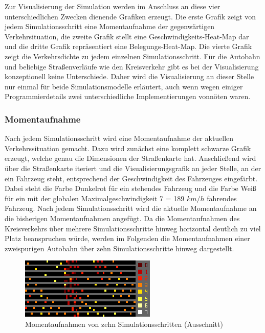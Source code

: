 \documentclass[11pt, a4paper]{article}
\begin{document}
Zur Visualisierung der Simulation werden im Anschluss an diese vier unterschiedlichen Zwecken dienende Grafiken
erzeugt. Die erste Grafik zeigt von jedem Simulationsschritt eine Momentaufnahme der gegenwärtigen Verkehrsituation, die zweite Grafik stellt eine Geschwindigkeits-Heat-Map dar und die dritte Grafik repräsentiert eine Belegungs-Heat-Map. Die vierte Grafik zeigt die Verkehrsdichte zu jedem einzelnen Simulationsschritt. Für die Autobahn und beliebige Straßenverläufe wie den Kreisverkehr gibt es bei der Visualisierung konzeptionell keine Unterschiede. Daher wird die Visualisierung an dieser Stelle nur einmal für beide Simulationsmodelle erläutert, auch wenn wegen einiger Programmierdetails zwei unterschiedliche Implementierungen vonnöten waren.

\subsubsection{Momentaufnahme}
\label{subsubsec:momentaufnahme}

Nach jedem Simulationsschritt wird eine Momentaufnahme der aktuellen Verkehrssituation gemacht. Dazu wird zunächst eine komplett schwarze Grafik erzeugt, welche genau die Dimensionen der Straßenkarte hat. Anschließend wird über die Straßenkarte iteriert und die Visualisierungsgrafik an jeder Stelle, an der ein Fahrzeug steht, entsprechend der Geschwindigkeit des Fahrzeuges eingefärbt. Dabei steht die Farbe Dunkelrot für ein stehendes Fahrzeug und die Farbe Weiß für ein mit der globalen Maximalgeschwindigkeit 7 = 189 $km/h$ fahrendes Fahrzeug. Nach jedem Simulationsschritt wird die aktuelle Momentaufnahme an die bisherigen Momentaufnahmen angefügt. Da die Momentaufnahmen des Kreisverkehrs über mehrere Simulationsschritte hinweg horizontal deutlich zu viel Platz beanspruchen würde, werden im Folgenden die Momentaufnahmen einer zweispurigen Autobahn über zehn Simulationsschritte hinweg dargestellt.

\begin{figure}[h!]
	\centering
	\includegraphics[height=2.91cm]{img/vis_multilane_2_lanes}
	\caption{Momentaufnahmen von zehn Simulationsschritten (Ausschnitt)}
	\label{fig:momentaufnameMultilane}
\end{figure}
\end{document}
